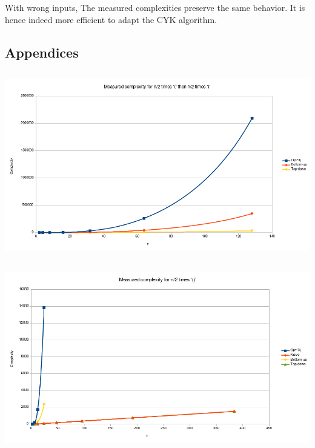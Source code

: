 \documentclass[twocolumn]{article}
\begin{document}
With wrong inputs, The measured complexities preserve the same behavior. It is hence indeed more efficient to adapt the CYK algorithm.

\newpage
\onecolumn
\setcounter{section}{0}
\subsection*{Appendices}

\subsection{ }
\begin{center}
  \label{fig:plr}
  \includegraphics[width=\textwidth]{paren/complexity_paren_lefts_rights}
\end{center}

\newpage
\subsection{ }
\begin{center}
  \label{fig:plr2}
  \includegraphics[width=\textwidth]{paren/complexity_paren_left_right}
\end{center}
\end{document}
